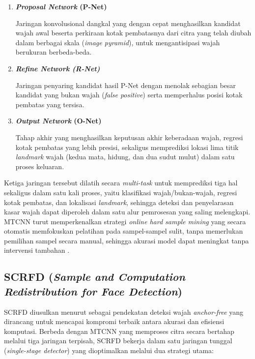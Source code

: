 \begin{enumerate}
	\item \textbf{\textit{Proposal Network} (P-Net)}
	
	Jaringan konvolusional dangkal yang dengan cepat menghasilkan kandidat wajah awal beserta perkiraan kotak pembatasnya dari citra yang telah diubah dalam berbagai skala (\textit{image pyramid}), untuk mengantisipasi wajah berukuran berbeda-beda.

	\item \textbf{\textit{Refine Network (R-Net)}}
	
	Jaringan penyaring kandidat hasil P-Net dengan menolak sebagian besar kandidat yang bukan wajah (\textit{false positive}) serta memperhalus posisi kotak pembatas yang tersisa.

	\item \textbf{\textit{Output Network} (O-Net)}
	
	Tahap akhir yang menghasilkan keputusan akhir keberadaan wajah, regresi kotak pembatas yang lebih presisi, sekaligus memprediksi lokasi lima titik \textit{landmark} wajah (kedua mata, hidung, dan dua sudut mulut) dalam satu proses keluaran.
	
\end{enumerate}

Ketiga jaringan tersebut dilatih secara \textit{multi-task} untuk memprediksi tiga hal sekaligus dalam satu kali proses, yaitu klasifikasi wajah/bukan-wajah, regresi kotak pembatas, dan lokalisasi \textit{landmark}, sehingga deteksi dan penyelarasan kasar wajah dapat diperoleh dalam satu alur pemrosesan yang saling melengkapi. MTCNN turut memperkenalkan strategi \textit{online hard sample mining} yang secara otomatis memfokuskan pelatihan pada sampel-sampel sulit, tanpa memerlukan pemilihan sampel secara manual, sehingga akurasi model dapat meningkat tanpa intervensi tambahan \autocite{zhang2016joint}.

\subsection{SCRFD (\textit{Sample and Computation Redistribution for Face Detection})}

SCRFD diusulkan menurut \textcite{guo2021scrfd} sebagai pendekatan deteksi wajah \textit{anchor-free} yang dirancang untuk mencapai kompromi terbaik antara akurasi dan efisiensi komputasi. Berbeda dengan MTCNN yang memproses citra secara bertahap melalui tiga jaringan terpisah, SCRFD bekerja dalam satu jaringan tunggal (\textit{single-stage detector}) yang dioptimalkan melalui dua strategi utama:

